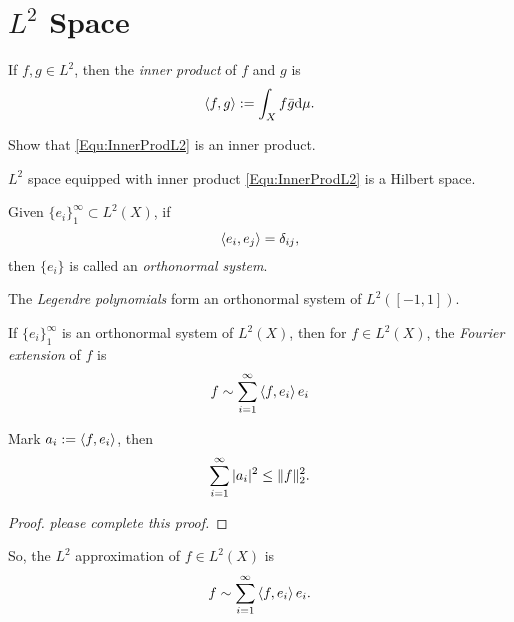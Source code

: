\section{$L^{2}$ Space}
\begin{defn}
    \label{Defn:InnerProdOnL2}
    If $f,g\in L^{2}$, then the \textit{inner product} of $f$ and $g$ 
    is 
    \begin{equation}
        \label{Equ:InnerProdL2}
        \left<f,g\right>:=\int_{X}f\bar{g}\mathrm{d}\mu.
    \end{equation}
\end{defn}
\begin{exc}
    Show that \eqref{Equ:InnerProdL2} is an inner product.
\end{exc}
\begin{thm}
    $L^{2}$ space equipped with inner product \eqref{Equ:InnerProdL2} 
    is a Hilbert space. 
\end{thm}
\begin{defn}
    \label{Defn:OrthonormalSet}
    Given $\{e_{i}\}_{1}^{\infty}\subset L^{2}(X)$, if 
    \begin{displaymath}
        \left\langle e_i,e_{j} \right\rangle=\delta_{ij},
    \end{displaymath}
    then $\{e_{i}\}$ is called an \textit{orthonormal system}.
\end{defn}
\begin{exm}
    The \textit{Legendre polynomials} form an orthonormal 
    system of $L^{2}([-1,1])$.
\end{exm}
\begin{defn}
    If $\{e_{i}\}_{1}^{\infty}$ is an orthonormal 
    system of $L^{2}(X)$, then for $f\in L^{2}(X)$, the 
    \textit{Fourier extension} of $f$ is 
    \begin{displaymath}
        f\sim\sum_{i=1}^{\infty}\left\langle f,e_i \right\rangle e_i
    \end{displaymath}
\end{defn}
\begin{thm}
    Mark $a_{i}:=\left\langle f,e_i \right\rangle$, then 
    \begin{displaymath}
        \sum_{i=1}^{\infty}|a_{i}|^{2}\le\|f\|_{2}^{2}.
    \end{displaymath}
\end{thm}
\begin{proof}
    \textit{please complete this proof.}
\end{proof}
\begin{rem}
    So, the $L^{2}$ approximation of $f\in L^{2}(X)$ is 
    \begin{displaymath}
        f\sim\sum_{i=1}^{\infty}\left\langle f,e_i \right\rangle e_i.
    \end{displaymath}
\end{rem}
